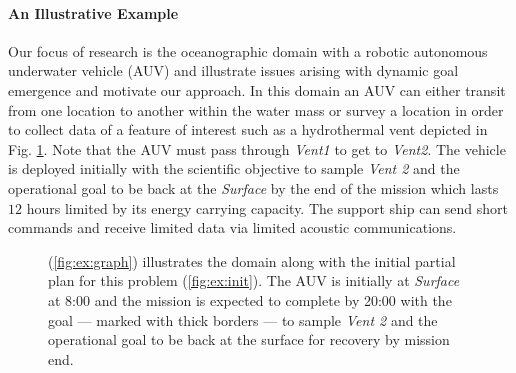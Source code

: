 \paragraph{An Illustrative Example} 

Our focus of research is the oceanographic domain with a robotic
autonomous underwater vehicle (AUV) and illustrate issues arising with
dynamic goal emergence and motivate our approach.  In this domain an
AUV can either transit from one location to another within the water
mass or survey a location in order to collect data of a feature of
interest such as a hydrothermal vent depicted in
Fig. \ref{fig:Example}.  Note that the AUV must pass through {\em
  Vent1} to get to {\em Vent2}.  The vehicle is deployed initially
with the scientific objective to sample {\em Vent 2} and the
operational goal to be back at the {\em Surface} by the end of the
mission which lasts $12$ hours limited by its energy carrying
capacity. The support ship can send short commands and receive limited
data via limited acoustic communications.

\begin{figure}[!t]
  \centering
  \hfill {}
  \caption{\small{(\ref{fig:ex:graph}) illustrates the domain along
      with the initial partial plan for this problem
      (\ref{fig:ex:init}). The AUV is initially at {\em Surface} at
      8:00 and the mission is expected to complete by 20:00 with the
      goal --- marked with thick borders --- to sample {\em Vent 2}
      and the operational goal to be back at the surface for recovery
      by mission end.}}
\label{fig:Example}
\end{figure}

